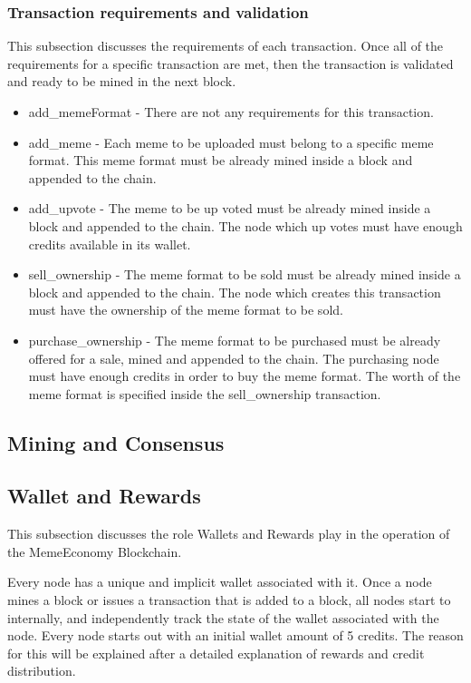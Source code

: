 \documentclass[12pt]{article}
\begin{document}
\subsubsection{Transaction requirements and validation}

This subsection discusses the requirements of each transaction. Once all of the requirements for a specific transaction are met, then the transaction is validated and ready to be mined in the next block.

\begin{itemize}
\item add\_memeFormat - There are not any requirements for this transaction.

\item add\_meme - Each meme to be uploaded must belong to a specific meme format. This meme format must be already mined inside a block and appended to the chain.

\item add\_upvote - The meme to be up voted must be already mined inside a block and appended to the chain. The node which up votes must have enough credits available in its wallet.

\item sell\_ownership - The meme format to be sold must be already mined inside a block and appended to the chain. The node which creates this transaction must have the ownership of the meme format to be sold.

\item purchase\_ownership - The meme format to be purchased must be already offered for a sale, mined and appended to the chain. The purchasing node must have enough credits in order to buy the meme format. The worth of the meme format is specified inside the sell\_ownership transaction.
\end{itemize}


\subsection{Mining and Consensus} %
\subsection{Wallet and Rewards} %

This subsection discusses the role Wallets and Rewards play in the
operation of the MemeEconomy Blockchain.

Every node has a unique and implicit wallet associated with it. Once a
node mines a block or issues a transaction that is added to a block,
all nodes start to internally, and independently track the state of
the wallet associated with the node. Every node starts out with an
initial wallet amount of 5 credits. The reason for this will be
explained after a detailed explanation of rewards and credit
distribution.
\end{document}
